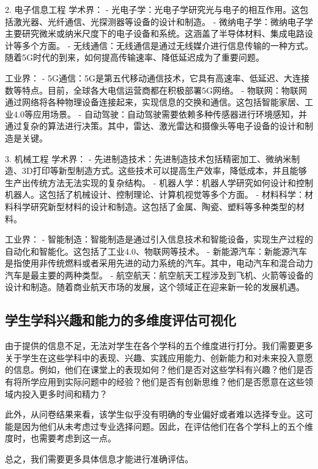 \documentclass[12pt]{article}
\begin{document}
\begin{CJK*}{UTF8}{gbsn}
2. 电子信息工程
   学术界：
   - 光电子学：光电子学研究光与电子的相互作用。这包括激光器、光纤通信、光探测器等设备的设计和制造。
   - 微纳电子学：微纳电子学主要研究微米或纳米尺度下的电子设备和系统。这涵盖了半导体材料、集成电路设计等多个方面。
   - 无线通信：无线通信是通过无线媒介进行信息传输的一种方式。随着5G时代的到来，如何提高传输速率、降低延迟成为了重要问题。

   工业界：
   - 5G通信：5G是第五代移动通信技术，它具有高速率、低延迟、大连接数等特点。目前，全球各大电信运营商都在积极部署5G网络。
   - 物联网：物联网通过网络将各种物理设备连接起来，实现信息的交换和通信。这包括智能家居、工业4.0等应用场景。
   - 自动驾驶：自动驾驶需要依赖多种传感器进行环境感知，并通过复杂的算法进行决策。其中，雷达、激光雷达和摄像头等电子设备的设计和制造是关键。

3. 机械工程
   学术界：
   - 先进制造技术：先进制造技术包括精密加工、微纳米制造、3D打印等新型制造方式。这些技术可以提高生产效率，降低成本，并且能够生产出传统方法无法实现的复杂结构。
   - 机器人学：机器人学研究如何设计和控制机器人。这包括了机械设计、控制理论、计算机视觉等多个方面。
   - 材料科学：材料科学研究新型材料的设计和制造。这包括了金属、陶瓷、塑料等多种类型的材料。

   工业界：
   - 智能制造：智能制造是通过引入信息技术和智能设备，实现生产过程的自动化和智能化。这包括了工业4.0、物联网等技术。
   - 新能源汽车：新能源汽车是指使用非传统燃料或者采用先进的动力系统的汽车。其中，电动汽车和混合动力汽车是最主要的两种类型。
   - 航空航天：航空航天工程涉及到飞机、火箭等设备的设计和制造。随着商业航天市场的发展，这个领域正在迎来新一轮的发展机遇。

   \newpage
   \subsection*{学生学科兴趣和能力的多维度评估可视化}
   由于提供的信息不足，无法对学生在各个学科的五个维度进行打分。我们需要更多关于学生在这些学科中的表现、兴趣、实践应用能力、创新能力和对未来投入意愿的信息。例如，他们在课堂上的表现如何？他们是否对这些学科有兴趣？他们是否有将所学应用到实际问题中的经验？他们是否有创新思维？他们是否愿意在这些领域内投入更多时间和精力？

此外，从问卷结果来看，该学生似乎没有明确的专业偏好或者难以选择专业。这可能是因为他们从未考虑过专业选择问题。因此，在评估他们在各个学科上的五个维度时，也需要考虑到这一点。

总之，我们需要更多具体信息才能进行准确评估。
   

\end{CJK*}
\end{document}
